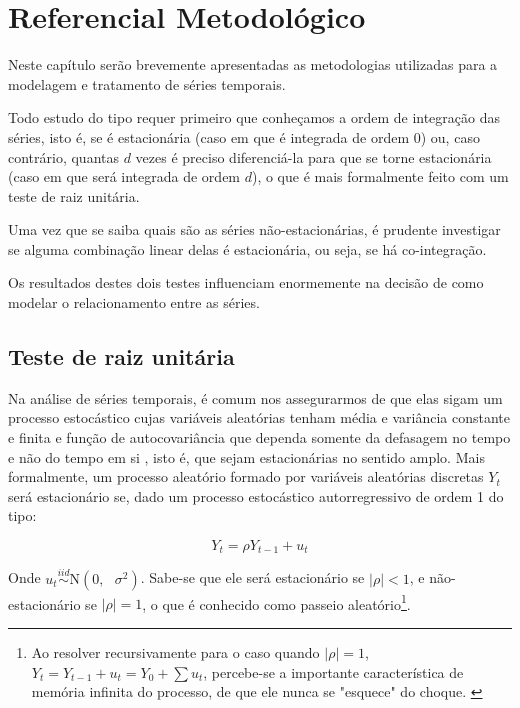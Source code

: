 \documentclass[a4paper,
               article,
               12pt,
               openany,
               oneside,
               english,
               brazil]{abntex2}
\numberwithin{equation}{section}
\begin{document}
\section{Referencial Metodológico}

    Neste capítulo serão brevemente apresentadas as metodologias utilizadas para a modelagem e tratamento de séries temporais.

    Todo estudo do tipo requer primeiro que conheçamos a ordem de integração das séries, isto é, se é estacionária (caso em que é integrada de ordem 0) ou, caso contrário, quantas $d$ vezes é preciso diferenciá-la para que se torne estacionária (caso em que será integrada de ordem $d$), o que é mais formalmente feito com um teste de raiz unitária.

    Uma vez que se saiba quais são as séries não-estacionárias, é prudente investigar se alguma combinação linear delas é estacionária, ou seja, se há co-integração.

    Os resultados destes dois testes influenciam enormemente na decisão de como modelar o relacionamento entre as séries. 

    \subsection{Teste de raiz unitária}

    Na análise de séries temporais, é comum nos assegurarmos de que elas sigam um processo estocástico cujas variáveis aleatórias tenham média e variância constante e finita e função de autocovariância que dependa somente da defasagem no tempo e não do tempo em si \cite[p.~734]{gujarati}, isto é, que sejam estacionárias no sentido amplo. Mais formalmente, um processo aleatório formado por variáveis aleatórias discretas $Y_t$ será estacionário se, dado um processo estocástico autorregressivo de ordem 1 do tipo:

    \begin{equation}\label{processo_estocastico} Y_t = \rho Y_{t-1} + u_t \end{equation}

    Onde $ u_t \stackrel{iid}{\sim} \text{N}(0,\text{ }\sigma^2) $. Sabe-se que ele será estacionário se $ \lvert \rho \rvert < 1 $, e não-estacionário se $ \lvert \rho \rvert = 1 $, o que é conhecido como passeio aleatório\footnote{Ao resolver recursivamente para o caso quando $ \lvert \rho \rvert = 1 $, $ Y_t = Y_{t-1} + u_t = Y_0 + \sum u_t $, percebe-se a importante característica de memória infinita do processo, de que ele nunca se "esquece" do choque. \cite[p.~736]{gujarati}}.
\end{document}
